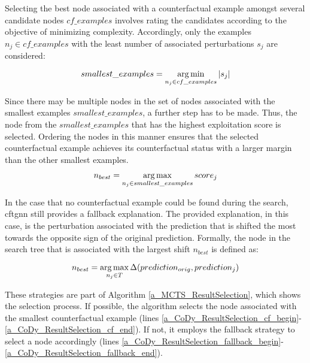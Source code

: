 Selecting the best node associated with a counterfactual example amongst several candidate nodes \(cf\_examples\) involves rating the candidates according to the objective of minimizing complexity. Accordingly, only the examples $n_j \in cf\_examples$ with the least number of associated perturbations $s_j$ are considered:

\begin{equation}
    smallest\_examples = \operatorname*{arg\,min}_{n_j \in cf\_examples} |s_j|
\end{equation}

Since there may be multiple nodes in the set of nodes associated with the smallest examples $smallest\_examples$, a further step has to be made. Thus, the node from the $smallest\_examples$ that has the highest exploitation score is selected. Ordering the nodes in this manner ensures that the selected counterfactual example achieves its counterfactual status with a larger margin than the other smallest examples.

\begin{equation}
    n_{best} = \operatorname*{arg\,max}_{n_j \in smallest\_examples} score_j
\end{equation}

In the case that no counterfactual example could be found during the search, \gls{cftgnn} still provides a fallback explanation. The provided explanation, in this case, is the perturbation associated with the prediction that is shifted the most towards the opposite sign of the original prediction. Formally, the node in the search tree that is associated with the largest shift $n_{best}$ is defined as:

\begin{equation}
    n_{best} = \operatorname*{arg\,max}_{n_j \in T} \Delta(prediction_{orig}, prediction_j)
\end{equation}

These strategies are part of Algorithm \ref{a_MCTS_ResultSelection}, which shows the selection process. If possible, the algorithm selects the node associated with the smallest counterfactual example (lines \ref{a_CoDy_ResultSelection_cf_begin}-\ref{a_CoDy_ResultSelection_cf_end}). If not, it employs the fallback strategy to select a node accordingly (lines \ref{a_CoDy_ResultSelection_fallback_begin}-\ref{a_CoDy_ResultSelection_fallback_end}).

